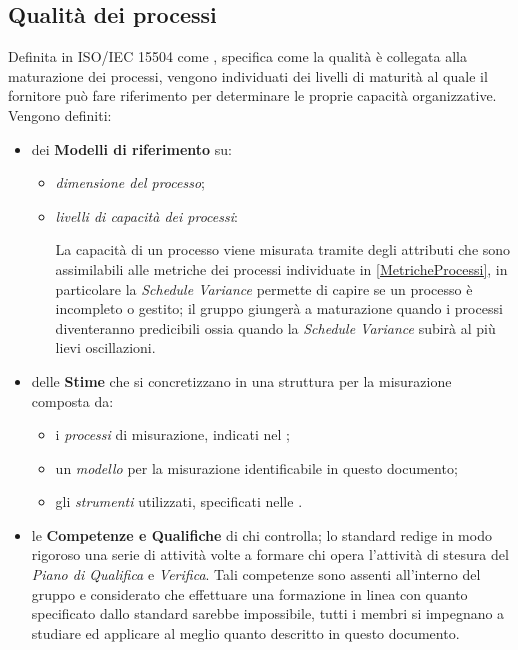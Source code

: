 	\subsection{Qualità dei processi}
	Definita in ISO/IEC 15504 come , specifica come la qualità è collegata alla maturazione dei processi, vengono individuati dei livelli di maturità al quale il fornitore può fare riferimento per determinare le proprie capacità organizzative. Vengono definiti:
	\begin{itemize}
		\item dei \textbf{Modelli di riferimento} su:
			\begin{itemize}
				\item \emph{dimensione del processo};
				\item \emph{livelli di capacità dei processi}:
					La capacità di un processo viene misurata tramite degli attributi che sono assimilabili alle metriche dei processi individuate in \ref{MetricheProcessi}, in particolare la \emph{Schedule Variance} permette di capire se un processo è incompleto o gestito; il gruppo giungerà a maturazione quando i processi diventeranno predicibili ossia quando la \emph{Schedule Variance} subirà al più lievi oscillazioni.
			\end{itemize}
		\item delle \textbf{Stime} che si concretizzano in una struttura per la misurazione composta da:
			\begin{itemize}
				\item i \emph{processi} di misurazione, indicati nel \PianoDiProgetto ;
				\item un \emph{modello} per la misurazione identificabile in questo documento;
				\item gli \emph{strumenti} utilizzati, specificati nelle \NormeDiProgetto .
			\end{itemize}
		\item le \textbf{Competenze e Qualifiche} di chi controlla; lo standard redige in modo rigoroso una serie di attività volte a formare chi opera l'attività di stesura del \emph{Piano di Qualifica} e \emph{Verifica}. Tali competenze sono assenti all'interno del gruppo e considerato che effettuare una formazione in linea con quanto specificato dallo standard sarebbe impossibile, tutti i membri si impegnano a studiare ed applicare al meglio quanto descritto in questo documento.
	\end{itemize}
	
